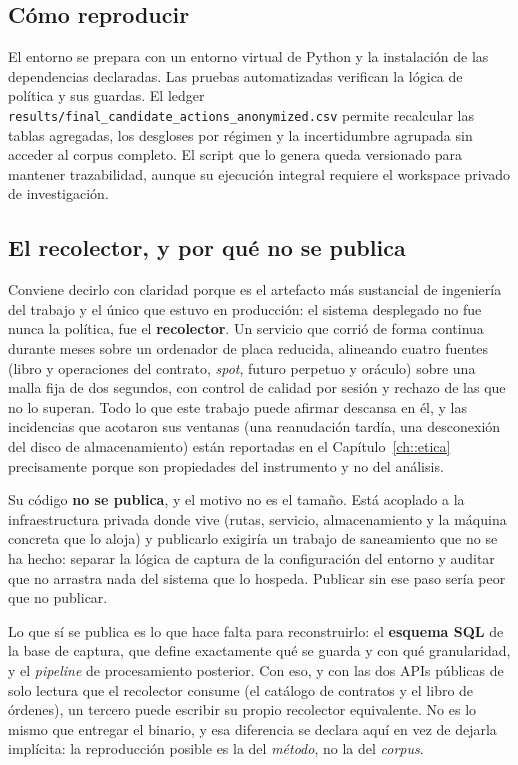 \subsection{Cómo reproducir}

El entorno se prepara con un entorno virtual de Python y la instalación de las dependencias
declaradas. Las pruebas automatizadas verifican la lógica de política y sus guardas. El ledger
\texttt{results/final\_candidate\_actions\_anonymized.csv} permite recalcular las tablas
agregadas, los desgloses por régimen y la incertidumbre agrupada sin acceder al corpus
completo. El script que lo genera queda versionado para mantener trazabilidad, aunque su
ejecución integral requiere el workspace privado de investigación.

\subsection{El recolector, y por qué no se publica}
\label{sec::recolector_no_publica}

Conviene decirlo con claridad porque es el artefacto más sustancial de ingeniería del trabajo
y el único que estuvo en producción: el sistema desplegado no fue nunca la política, fue el
\textbf{recolector}. Un servicio que corrió de forma continua durante meses sobre un
ordenador de placa reducida, alineando cuatro fuentes (libro y operaciones del contrato,
\emph{spot}, futuro perpetuo y oráculo) sobre una malla fija de dos segundos, con control de
calidad por sesión y rechazo de las que no lo superan. Todo lo que este trabajo puede afirmar
descansa en él, y las incidencias que acotaron sus ventanas (una reanudación tardía, una
desconexión del disco de almacenamiento) están reportadas en el Capítulo~\ref{ch::etica}
precisamente porque son propiedades del instrumento y no del análisis.

Su código \textbf{no se publica}, y el motivo no es el tamaño. Está acoplado a la
infraestructura privada donde vive (rutas, servicio, almacenamiento y la máquina concreta que
lo aloja) y publicarlo exigiría un trabajo de saneamiento que no se ha hecho: separar la
lógica de captura de la configuración del entorno y auditar que no arrastra nada del sistema
que lo hospeda. Publicar sin ese paso sería peor que no publicar.

Lo que sí se publica es lo que hace falta para reconstruirlo: el \textbf{esquema SQL} de la
base de captura, que define exactamente qué se guarda y con qué granularidad, y el
\emph{pipeline} de procesamiento posterior. Con eso, y con las dos APIs públicas de solo
lectura que el recolector consume (el catálogo de contratos y el libro de órdenes), un
tercero puede escribir su propio recolector equivalente. No es lo mismo que entregar el
binario, y esa diferencia se declara aquí en vez de dejarla implícita: la reproducción
posible es la del \emph{método}, no la del \emph{corpus}.

